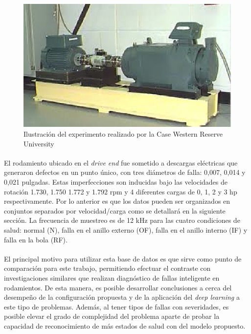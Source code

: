 \documentclass[12pt]{article}
\begin{document}
\begin{figure}[ht]
  \centering
    \includegraphics[scale=0.8]{./bearing.eps}
  \caption{Ilustración del experimento realizado por la Case Western Reserve University \cite{case}}
  \label{fig:bearing}
\end{figure}

\paragraph{}
El rodamiento ubicado en el \textit{drive end} fue sometido a descargas eléctricas que generaron defectos en un  punto único, con tres diámetros de falla: 0,007, 0,014 y 0,021 pulgadas. Estas imperfecciones son inducidas bajo las velocidades de rotación 1.730, 1.750 1.772 y 1.792 rpm y 4 diferentes cargas de 0, 1, 2 y 3 hp respectivamente. Por lo anterior es que los datos pueden ser organizados en conjuntos separados por velocidad/carga como se detallará en la siguiente sección. La frecuencia de muestreo es de 12 kHz para las cuatro condiciones de salud: normal (N), falla en el anillo externo (OF), falla en el anillo interno (IF) y falla en la bola (RF). 

\paragraph{}
El principal motivo para utilizar esta base de datos es que sirve como punto de comparación para este trabajo, permitiendo efectuar el contraste con investigaciones similares que realizan diagnóstico de fallas inteligente en rodamientos. De esta manera, es posible desarrollar conclusiones a cerca del desempeño de la configuración propuesta y de la aplicación del \textit{deep learning} a este tipo de problemas. Además, al tener tipos de fallas con severidades, es posible elevar el grado de complejidad del problema aparte de probar la capacidad de reconocimiento de más estados de salud con del modelo propuesto.
\end{document}
